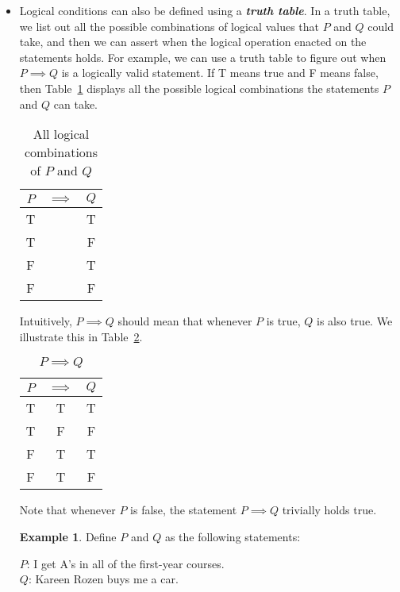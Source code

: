 \documentclass{article}
\newcommand{\keyword}[1]{\textit{\textbf{#1}}\index{#1}}
\theoremstyle{definition}
\newtheorem{ex}{Example}
\begin{document}
\begin{itemize}
    \item Logical conditions can also be defined using a \keyword{truth table}. In a truth table, we list out all the possible combinations of logical values that $P$ and $Q$ could take, and then we can assert when the logical operation enacted on the statements holds. For example, we can use a truth table to figure out when $P \implies Q$ is a logically valid statement. If T means true and F means false, then Table~\ref{tab:P_Q_logic} displays all the possible logical combinations the statements $P$ and $Q$ can take. 
    \begin{table}[ht]
        \centering
        \begin{tabular}{c c c}
             $P$ & $\implies$ & $Q$\\\hline
             T & & T \\
             T & & F \\
             F & & T \\
             F & & F \\
        \end{tabular}
        \caption{All logical combinations of $P$ and $Q$}
        \label{tab:P_Q_logic}
    \end{table}
    Intuitively, $P \implies Q$ should mean that whenever $P$ is true, $Q$ is also true. We illustrate this in Table~\ref{tab:P_imp_Q}.
    \begin{table}[ht]
        \centering
        \begin{tabular}{c c c}
             $P$ & \color{blue}$\implies$ & $Q$\\\hline
             T & \color{blue}T & T \\
             T & \color{blue}F & F \\
             F & \color{blue}T & T \\
             F & \color{blue}T & F \\
        \end{tabular}
        \caption{$P\implies Q$}
        \label{tab:P_imp_Q}
    \end{table}
    Note that whenever $P$ is false, the statement $P\implies Q$ trivially holds true. 
    \begin{ex}\label{ex:P_imp_Q}
        Define $P$ and $Q$ as the following statements:
        \begin{center}
            $P$: I get A's in all of the first-year courses.\\
            $Q$: Kareen Rozen buys me a car. 
        \end{center}

\end{ex}
\end{itemize}
\end{document}

